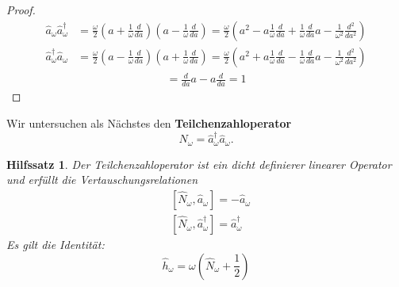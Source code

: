 \documentclass[11pt,a4paper,leqno]{report}
\newtheorem{lemma}[theorem]{Hilfssatz}
\numberwithin{equation}{chapter}
\begin{document}
\begin{proof}
\begin{align*}
	\hat{a}_\omega\hat{a}_\omega^\dagger &= 
	\frac{\omega}{2}(a + \frac{1}{\omega}\frac{d}{da})(a - \frac{1}{\omega}\frac{d}{da})=
	\frac{\omega}{2}(a^2 - a\frac{1}{\omega}\frac{d}{da} + \frac{1}{\omega}\frac{d}{da}a -\frac{1}{\omega^2}\frac{d^2}{da^2})
\end{align*}
\begin{align}
	\hat{a}_\omega^\dagger\hat{a}_\omega &= 
	\frac{\omega}{2}(a - \frac{1}{\omega}\frac{d}{da})(a + \frac{1}{\omega}\frac{d}{da})=
	\frac{\omega}{2}(a^2 + a\frac{1}{\omega}\frac{d}{da} - \frac{1}{\omega}\frac{d}{da}a -\frac{1}{\omega^2}\frac{d^2}{da^2})\label{eq:ref12}
\end{align}
\begin{align*}
	[\hat{a}_\omega,\hat{a}_\omega^\dagger] =\frac{d}{da}a-a\frac{d}{da} = 1
\end{align*}
\end{proof}
\noindent
Wir untersuchen als Nächstes den \textbf{Teilchenzahloperator}
\begin{equation}
	\hat{N}_\omega = \hat{a}_\omega^\dagger\hat{a}_\omega. \label{eq:number}
\end{equation}
\begin{lemma}\label{thm:Teilcheanzahl}
	Der Teilchenzahloperator ist ein dicht definierer linearer Operator und erf\"ullt die Vertauschungsrelationen
	\begin{align}
		& [\hat{N}_\omega, \hat{a}_\omega] = -\hat{a}_\omega\label{eq:komm1}\\
		& [\hat{N}_\omega, \hat{a}^\dagger_\omega] = \hat{a}^\dagger_\omega\label{eq:komm2}
	\end{align}
	Es gilt die Identit\"at:
\begin{equation}
	\hat{h}_\omega = \omega (\hat{N}_\omega + \frac{1}{2})
\end{equation}
\end{lemma}
\end{document}
